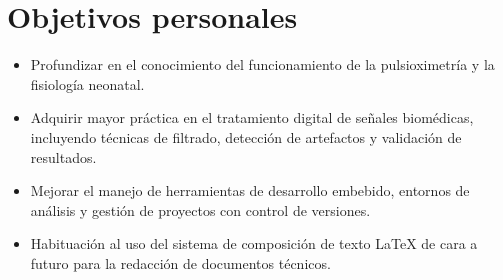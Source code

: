 \section{Objetivos personales}
    \begin{itemize}
        \item Profundizar en el conocimiento del funcionamiento de la pulsioximetría y la fisiología neonatal.
        \item Adquirir mayor práctica en el tratamiento digital de señales biomédicas, incluyendo técnicas de filtrado, detección de artefactos y validación de resultados.
        \item Mejorar el manejo de herramientas de desarrollo embebido, entornos de análisis y gestión de proyectos con control de versiones.
        \item Habituación al uso del sistema de composición de texto LaTeX de cara a futuro para la redacción de documentos técnicos.
    \end{itemize}








